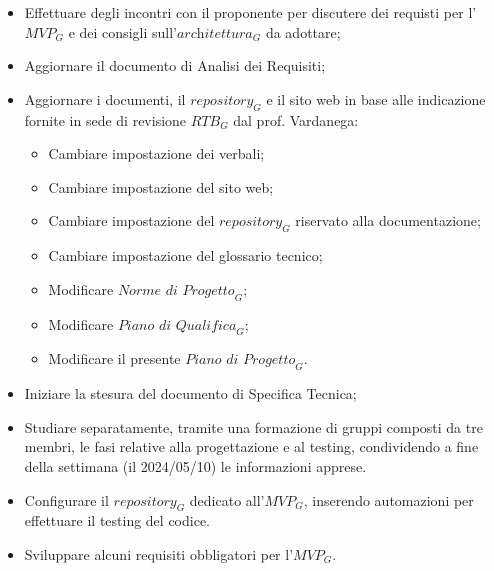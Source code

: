 \begin{itemize}
    \item Effettuare degli incontri con il proponente per discutere dei requisti per l'$\textit{MVP}_G$ e dei consigli sull'$\textit{architettura}_G$ da adottare;
    \item Aggiornare il documento di Analisi dei Requisiti;
    \item Aggiornare i documenti, il $\textit{repository}_G$ e il sito web in base alle indicazione fornite in sede di revisione $\textit{RTB}_G$ dal prof. Vardanega:
    \begin{itemize}
        \item Cambiare impostazione dei verbali;
        \item Cambiare impostazione del sito web;
        \item Cambiare impostazione del $\textit{repository}_G$ riservato alla documentazione;
        \item Cambiare impostazione del glossario tecnico;
        \item Modificare $\textit{Norme di Progetto}_G$;
        \item Modificare $\textit{Piano di Qualifica}_G$;
        \item Modificare il presente $\textit{Piano di Progetto}_G$.
    \end{itemize}
    \item Iniziare la stesura del documento di Specifica Tecnica;
    \item Studiare separatamente, tramite una formazione di gruppi composti da tre membri, le fasi relative alla progettazione e al testing, condividendo a fine della settimana (il 2024/05/10) le informazioni apprese. 
    \item Configurare il $\textit{repository}_G$ dedicato all'$\textit{MVP}_G$, inserendo automazioni per effettuare il testing del codice.
    \item Sviluppare alcuni requisiti obbligatori per l'$\textit{MVP}_G$.
\end{itemize}
